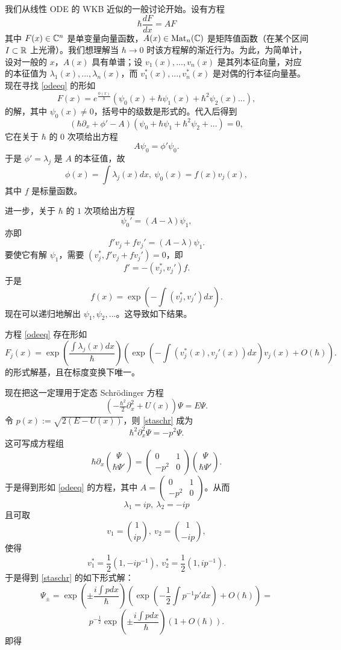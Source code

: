 我们从线性 ODE 的 WKB 近似的一般讨论开始。设有方程
\begin{equation}\label{odeeq}
\hbar\frac{dF}{dx}=AF
\end{equation}
其中 $F(x)\in \Bbb C^n$ 是单变量向量函数，$A(x)\in {\rm Mat}_n(\Bbb C)$ 是矩阵值函数（在某个区间 $I\subset \Bbb R$ 上光滑）。我们想理解当 $\hbar\to 0$ 时该方程解的渐近行为。为此，为简单计，设对一般的 $x$，$A(x)$ 具有单谱；设 $v_1(x),...,v_n(x)$ 是其列本征向量，对应的本征值为 $\lambda_1(x),...,\lambda_n(x)$，而 $v_1^*(x),...,v_n^*(x)$ 是对偶的行本征向量基。现在寻找 \eqref{odeeq} 的形如
$$
F(x)=e^{\frac{\phi(x)}{\hbar}}(\psi_0(x)+\hbar \psi_1(x)+\hbar^2 \psi_2(x)...),
$$
的解，其中 $\psi_0(x)\ne 0$，括号中的级数是形式的。代入后得到
$$
(\hbar\partial_x+\phi'-A)(\psi_0+\hbar \psi_1+\hbar^2 \psi_2+...)=0,
$$
它在关于 $\hbar$ 的 $0$ 次项给出方程
$$
A\psi_0=\phi'\psi_0.
$$
于是 $\phi'=\lambda_j$ 是 $A$ 的本征值，故
$$
\phi(x)=\int \lambda_j(x)dx,\ \psi_0(x)=f(x)v_j(x),
$$ 
其中 $f$ 是标量函数。

进一步，关于 $\hbar$ 的 $1$ 次项给出方程
$$\psi_0'=(A-\lambda)\psi_1,$$
亦即
$$
f'v_j+fv_j'=(A-\lambda)\psi_1. 
$$
要使它有解 $\psi_1$，需要
$(v_j^*,f'v_j+fv_j')=0$，即
$$
f'=-(v_j^*,v_j')f.
$$
于是
$$
f(x)=\exp\left(-\int (v_j^*,v_j')dx\right). 
$$
现在可以递归地解出 $\psi_1,\psi_2,...$。这导致如下结果。

\begin{theorem}
方程 \eqref{odeeq} 存在形如
$$
F_j(x)=\exp\left(\frac{\int \lambda_j(x)dx}{\hbar}\right)\left(\exp\left(-\int (v_j^*(x),v_j'(x))dx\right)v_j(x)+O(\hbar)\right).
$$
的形式解基，且在标度变换下唯一。
\end{theorem} 

现在把这一定理用于定态 Schrödinger 方程
\begin{equation}\label{staschr}
(-\tfrac{\hbar^2}{2}\partial_x^2+U(x))\Psi=E\Psi.
\end{equation} 
令 $p(x):=\sqrt{2(E-U(x))}$，则 \eqref{staschr} 成为
$$
\hbar^2\partial_x^2\Psi=-p^2\Psi.
$$
这可写成方程组
$$
\hbar \partial_x \binom{\Psi}{\hbar \Psi'}=\begin{pmatrix} 0 & 1 \\ -p^2 & 0\end{pmatrix}\binom{\Psi}{\hbar \Psi'}.
$$
于是得到形如 \eqref{odeeq} 的方程，其中 $A=\begin{pmatrix} 0 & 1 \\ -p^2 & 0\end{pmatrix}$。从而
$$
\lambda_1=ip,\ \lambda_2=-ip
$$
且可取
$$ 
v_1=\binom{1}{ip},\ v_2=\binom{1}{-ip},
$$
使得
$$
v_1^*=\frac{1}{2}(1,-ip^{-1}),\ v_2^*=\frac{1}{2}(1,ip^{-1}).
$$ 
于是得到 \eqref{staschr} 的如下形式解：
$$
\Psi_\pm=\exp\left(\pm \frac{i\int pdx}{\hbar}\right)\left(\exp\left(-\frac{1}{2}\int p^{-1}p'dx\right)+O(\hbar)\right)=
$$
$$
p^{-\frac{1}{2}}\exp\left(\pm\frac{i\int pdx}{\hbar}\right)(1+O(\hbar)).
$$
即得

